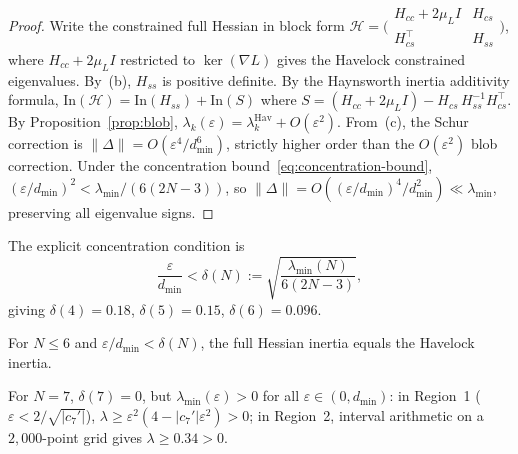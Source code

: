 \begin{proof}
Write the constrained full Hessian in block form
$\mathcal{H} = \bigl(\begin{smallmatrix} H_{cc}{+}2\mu_L I & H_{cs} \\ H_{cs}^\top & H_{ss} \end{smallmatrix}\bigr)$,
where $H_{cc}{+}2\mu_L I$ restricted to $\ker(\nabla L)$ gives
the Havelock constrained eigenvalues.
By~(b), $H_{ss}$ is positive definite.
By the Haynsworth inertia additivity formula,
$\mathrm{In}(\mathcal{H})
= \mathrm{In}(H_{ss}) + \mathrm{In}(S)$
where $S = (H_{cc}{+}2\mu_L I) - H_{cs}\,H_{ss}^{-1}H_{cs}^\top$.
By Proposition~\ref{prop:blob},
$\lambda_k(\varepsilon)
= \lambda_k^{\mathrm{Hav}} + O(\varepsilon^2)$.
From~(c), the Schur correction is
$\|\Delta\| = O(\varepsilon^4/d_{\min}^6)$,
strictly higher order than the $O(\varepsilon^2)$ blob correction.
Under the concentration bound~\eqref{eq:concentration-bound},
$(\varepsilon/d_{\min})^2 < \lambda_{\min}/(6(2N{-}3))$,
so $\|\Delta\| = O((\varepsilon/d_{\min})^4/d_{\min}^2)
\ll \lambda_{\min}$, preserving all eigenvalue signs.
\end{proof}

The explicit concentration condition is
\begin{equation}\label{eq:concentration-bound}
  \frac{\varepsilon}{d_{\min}} < \delta(N)
  := \sqrt{\frac{\lambda_{\min}(N)}{6(2N{-}3)}},
\end{equation}
giving $\delta(4) = 0.18$, $\delta(5) = 0.15$, $\delta(6) = 0.096$.

\begin{corollary}
\label{cor:inertia-N6}
For $N \le 6$ and $\varepsilon/d_{\min} < \delta(N)$,
the full Hessian inertia equals the Havelock inertia.
\end{corollary}

\begin{corollary}[Marginal-mode resolution for $N = 7$]
\label{cor:inertia-N7}
For $N = 7$, $\delta(7) = 0$, but
$\lambda_{\min}(\varepsilon) > 0$ for all $\varepsilon \in (0, d_{\min})$:
in Region~1 ($\varepsilon < 2/\sqrt{|c_7'|}$),
$\lambda \ge \varepsilon^2(4 - |c_7'|\varepsilon^2) > 0$;
in Region~2, interval arithmetic on a $2{,}000$-point grid
gives $\lambda \ge 0.34 > 0$.
\end{corollary}




